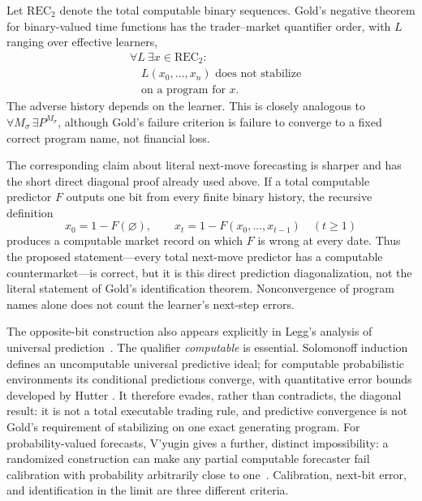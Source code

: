 \documentclass[aps,pra,reprint,superscriptaddress,amsmath,amssymb,floatfix]{revtex4-2}
\theoremstyle{plain}
\theoremstyle{definition}
\theoremstyle{remark}
\begin{document}
Let \(\mathrm{REC}_2\) denote the total computable binary sequences. Gold's
negative theorem for binary-valued time functions has the trader--market
quantifier order, with \(L\) ranging over effective learners,
\begin{equation}
  \begin{aligned}
  &\forall L\ \exists x\in\mathrm{REC}_2: \\
  &\quad L(x_0,\ldots,x_n)\text{ does not stabilize}\\
  &\quad \text{on a program for }x .
  \end{aligned}
  \label{eq:goldquantifiers}
\end{equation}
The adverse history depends on the learner. This is closely analogous to
\(\forall M_\sigma\,\exists P^{M_\sigma}\), although Gold's failure criterion
is failure to converge to a fixed correct program name, not financial loss.

The corresponding claim about literal next-move forecasting is sharper and
has the short direct diagonal proof already used above. If a total computable
predictor \(F\) outputs one bit from every finite binary history, the recursive
definition
\[
  x_0=1-F(\varnothing),
  \qquad
  x_t=1-F(x_0,\ldots,x_{t-1})\quad(t\geq1)
\]
produces a computable market record on which \(F\) is wrong at every date.
Thus the proposed statement---every total next-move predictor has a computable
countermarket---is correct, but it is this direct prediction diagonalization,
not the literal statement of Gold's identification theorem. Nonconvergence of
program names alone does not count the learner's next-step errors.

The opposite-bit construction also appears explicitly in Legg's analysis of
universal prediction~\cite{Legg2006}. The qualifier \emph{computable} is
essential. Solomonoff induction defines an uncomputable universal predictive
ideal; for computable probabilistic environments its conditional predictions
converge, with quantitative error bounds developed by Hutter
\cite{solomonoff,solomonoff-II,solomonoff1,Hutter2001}. It therefore evades,
rather than contradicts, the diagonal result: it is not a total executable
trading rule, and predictive convergence is not Gold's requirement of
stabilizing on one exact generating program. For probability-valued forecasts,
V'yugin gives a further, distinct impossibility: a randomized construction can
make any partial computable forecaster fail calibration with probability
arbitrarily close to one~\cite{Vyugin2006}. Calibration, next-bit error, and
identification in the limit are three different criteria.
\end{document}
